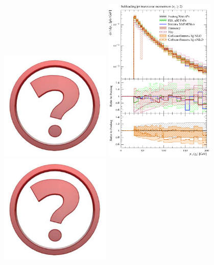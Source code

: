 \begin{figure}[t!]
  \centering
  \includegraphics[width=0.47\textwidth]{Micon.pdf}
  \hfill
  \includegraphics[width=0.47\textwidth]{figures/hjetscomp_jet2_pT_incl.pdf}
  \\[2mm]
  \includegraphics[width=0.47\textwidth]{Micon.pdf}

\end{figure}
